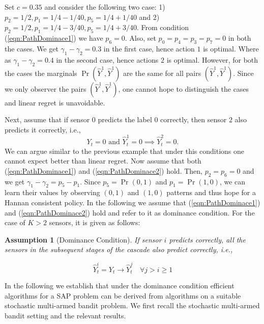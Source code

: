\documentclass{article}
\newtheorem{assumption}{Assumption}
\begin{document}
Set $c=0.35$ and consider the following two case: 1) $p_2=1/2, p_1=1/4-1/40, p_5=1/4+1/40$ and 2) $p_2=1/2, p_1=1/4-3/40,p_5=1/4+3/40$. From condition (\ref{eqn:PathDominace1}) we have $p_6=0$. Also, set $p_0=p_4=p_3=p_7=0$ in both the cases. We get $\gamma_1-\gamma_2=0.3$ in the first case, hence action $1$ is optimal. Where as $\gamma_1-\gamma_2=0.4$ in the second case, hence actions $2$ is optimal. However, for both the cases the marginals $\Pr(\hat{Y}^1, \hat{Y}^1)$ are the same for all pairs $(\hat{Y}^1, \hat{Y}^1)$. Since we only observer the pairs $(\hat{Y}^1, \hat{Y}^1)$, one cannot hope to distinguish the cases and linear regret is unavoidable. 

Next, assume that  if sensor $0$ predicts the label $0$ correctly, then sensor $2$ also predicts it correctly, i.e.,
\begin{equation}
\label{eqn:PathDominace2} 
Y_t=0 \mbox{ and } \hat{Y}_t^1=0 \implies \hat{Y}^2_t=0. 
\end{equation}
We can argue similar to the previous example that under this conditions one cannot expect better than linear regret. Now assume that both (\ref{eqn:PathDominace1}) and (\ref{eqn:PathDominace2}) hold. Then, $p_2=p_6=0$ and we get $\gamma_1-\gamma_2=p_5-p_1$. Since $p_5=\Pr(0,1)$ and $p_1=\Pr(1,0)$, we can learn their values by observing $(0,1)$ and $(1,0)$ patterns and thus hope for a Hannan consistent policy. In the following we assume that (\ref{eqn:PathDominace1}) and (\ref{eqn:PathDominace2}) hold and refer to it as dominance condition. For the case of $K>2$ sensors, it is given as follows: 

\begin{assumption}[Dominance Condition]
	If sensor $i$ predicts correctly, all the sensors in the subsequent stages of the cascade also predict correctly, i.e.,
	
	\begin{equation}
	\label{eqn:DominanceCondition}
	\hat{Y}_t^i=Y_t \rightarrow \hat{Y}_t^j \quad \forall j>i\geq 1
	\end{equation}
\end{assumption}
In the following we establish that under the dominance condition efficient algorithms for a SAP problem can be derived from algorithms on a suitable stochastic multi-armed bandit problem. We first recall the stochastic multi-armed bandit setting and the relevant results. 
\end{document}
